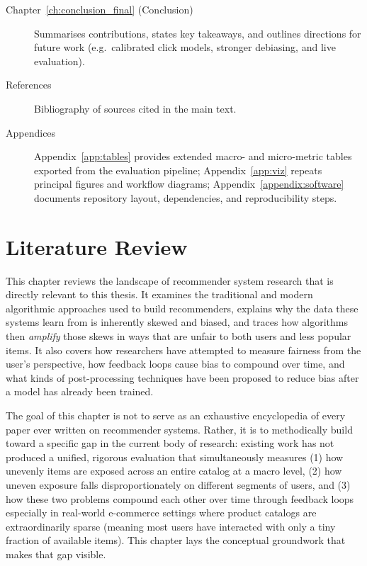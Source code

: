 \documentclass[11pt,a4paper]{report}
\begin{document}
\begin{description}
  \item[Chapter~\ref{ch:conclusion_final} (Conclusion)]
  Summarises contributions, states key takeaways, and outlines directions for future work (e.g.\ calibrated click models, stronger debiasing, and live evaluation).

  \item[References]
  Bibliography of sources cited in the main text.

  \item[Appendices]
  Appendix~\ref{app:tables} provides extended macro- and micro-metric tables exported from the evaluation pipeline; Appendix~\ref{app:viz} repeats principal figures and workflow diagrams; Appendix~\ref{appendix:software} documents repository layout, dependencies, and reproducibility steps.
\end{description}
\chapter{Literature Review}
\label{ch:lit_review}

This chapter reviews the landscape of recommender system research that is directly relevant to this thesis. It examines the traditional and modern algorithmic approaches used to build recommenders, explains why the data these systems learn from is inherently skewed and biased, and traces how algorithms then \emph{amplify} those skews in ways that are unfair to both users and less popular items. It also covers how researchers have attempted to measure fairness from the user's perspective, how feedback loops cause bias to compound over time, and what kinds of post-processing techniques have been proposed to reduce bias after a model has already been trained. 

The goal of this chapter is not to serve as an exhaustive encyclopedia of every paper ever written on recommender systems. Rather, it is to methodically build toward a specific gap in the current body of research: existing work has not produced a unified, rigorous evaluation that simultaneously measures (1) how unevenly items are exposed across an entire catalog at a macro level, (2) how uneven exposure falls disproportionately on different segments of users, and (3) how these two problems compound each other over time through feedback loops especially in real-world e-commerce settings where product catalogs are extraordinarily sparse (meaning most users have interacted with only a tiny fraction of available items). This chapter lays the conceptual groundwork that makes that gap visible.
\end{document}
